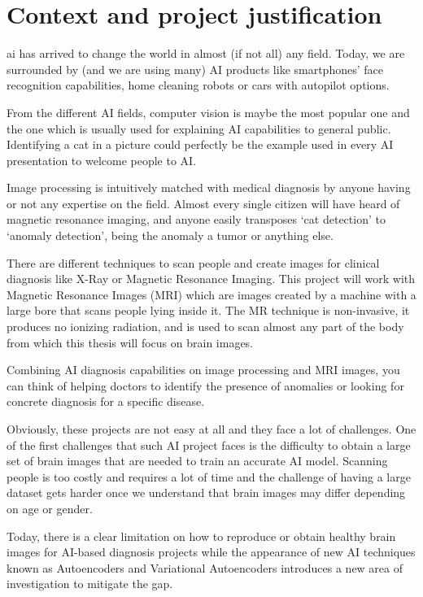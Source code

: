 \section{Context and project justification}

\acrfull*{ai} has arrived to change the world in almost (if not all) any field. Today, we are surrounded by (and we are using many) AI products like smartphones’ face recognition capabilities, home cleaning robots or cars with autopilot options.

From the different AI fields, computer vision is maybe the most popular one and the one which is usually used for explaining AI capabilities to general public. Identifying a cat in a picture could perfectly be the example used in every AI presentation to welcome people to AI.

Image processing is intuitively matched with medical diagnosis by anyone having or not any expertise on the field. Almost every single citizen will have heard of magnetic resonance imaging, and anyone easily transposes ‘cat detection’ to ‘anomaly detection’, being the anomaly a tumor or anything else.

There are different techniques to scan people and create images for clinical diagnosis like X-Ray or Magnetic Resonance Imaging. This project will work with Magnetic Resonance Images (MRI) which are images created by a machine with a large bore that scans people lying inside it. The MR technique is non-invasive, it produces no ionizing radiation, and is used to scan almost any part of the body from which this thesis will focus on brain images.

Combining AI diagnosis capabilities on image processing and MRI images, you can think of helping doctors to identify the presence of anomalies or looking for concrete diagnosis for a specific disease.

Obviously, these projects are not easy at all and they face a lot of challenges. One of the first challenges that such AI project faces is the difficulty to obtain a large set of brain images that are needed to train an accurate AI model. Scanning people is too costly and requires a lot of time and the challenge of having a large dataset gets harder once we understand that brain images may differ depending on age or gender.

Today, there is a clear limitation on how to reproduce or obtain healthy brain images for AI-based diagnosis projects while the appearance of new AI techniques known as Autoencoders and Variational Autoencoders introduces a new area of investigation to mitigate the gap.

